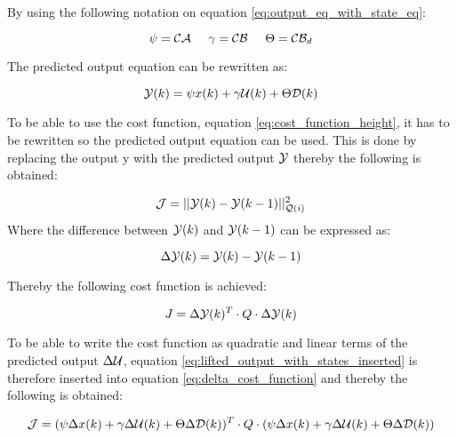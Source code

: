 By using the following notation on equation \ref{eq:output_eq_with_state_eq}:


\begin{equation}
 \psi = \CMcal{C}\CMcal{A}  \hspace{5mm} \gamma = \CMcal{C}\CMcal{B} \hspace{5mm}  \Theta = \CMcal{C}\CMcal{B}_{d}
\end{equation}

The predicted output equation can be rewritten as: 

\begin{equation}\label{eq:lifted_output_with_states_inserted}
	\CMcal{Y}(k) = \psi x(k) + \gamma \CMcal{U}(k) + \Theta \CMcal{D}(k)
\end{equation}

To be able to use the cost function, equation \ref{eq:cost_function_height}, it has to be rewritten so the predicted output equation can be used. This is done by replacing the output y with the predicted output $\CMcal{Y}$ thereby the following is obtained:

\begin{equation}
	\CMcal{J} = ||\CMcal{Y}(k)-\CMcal{Y}(k-1)||_{\CMcal{Q}(i)}^2
\end{equation}
Where the difference between $\CMcal{Y}(k)$ and $\CMcal{Y}(k-1)$ can be expressed as:

\begin{equation}
	\Delta \CMcal{Y}(k) =\CMcal{Y}(k)-\CMcal{Y}(k-1) 
\end{equation}

Thereby the following cost function is achieved:

\begin{equation}\label{eq:delta_cost_function}
	J = \Delta\CMcal{Y}(k)^T \cdot Q \cdot \Delta\CMcal{Y}(k)
\end{equation}

To be able to write the cost function as quadratic and linear terms of the predicted output $\Delta\CMcal{U}$, equation \ref{eq:lifted_output_with_states_inserted} is therefore inserted into equation \ref{eq:delta_cost_function} and thereby the following is obtained:

\begin{equation}\label{eq:cost_function_with_all_the_crap}
	\CMcal{J} = (\psi\Delta x(k) + \gamma\Delta \CMcal{U}(k) + \Theta\Delta \CMcal{D}(k))^T\cdot Q \cdot (\psi\Delta x(k) + \gamma\Delta \CMcal{U}(k) + \Theta\Delta \CMcal{D}(k))
\end{equation}

